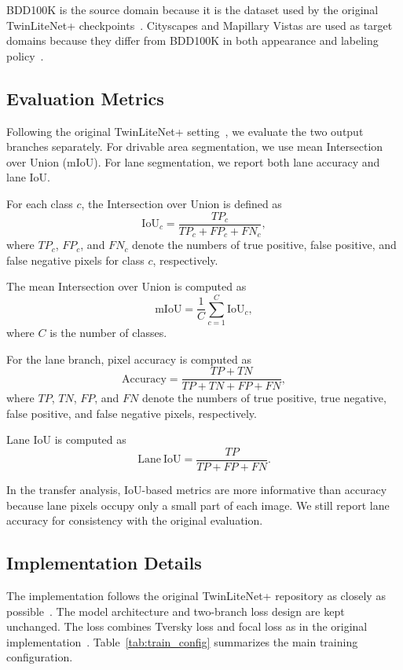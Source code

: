 \documentclass[conference]{IEEEtran}
\begin{document}
BDD100K is the source domain because it is the dataset used by the original TwinLiteNet+ checkpoints~\cite{ref1,ref2}. Cityscapes and Mapillary Vistas are used as target domains because they differ from BDD100K in both appearance and labeling policy~\cite{ref3,ref4}.




\subsection{Evaluation Metrics}
Following the original TwinLiteNet+ setting~\cite{ref1}, we evaluate the two output branches separately. For drivable area segmentation, we use mean Intersection over Union (mIoU). For lane segmentation, we report both lane accuracy and lane IoU.

For each class $c$, the Intersection over Union is defined as
\begin{equation}
  \mathrm{IoU}_c = \frac{TP_c}{TP_c + FP_c + FN_c},
\end{equation}
where $TP_c$, $FP_c$, and $FN_c$ denote the numbers of true positive, false positive, and false negative pixels for class $c$, respectively.

The mean Intersection over Union is computed as
\begin{equation}
  \mathrm{mIoU} = \frac{1}{C}\sum_{c=1}^{C}\mathrm{IoU}_c,
\end{equation}
where $C$ is the number of classes.

For the lane branch, pixel accuracy is computed as
\begin{equation}
  \mathrm{Accuracy} = \frac{TP + TN}{TP + TN + FP + FN},
\end{equation}
where $TP$, $TN$, $FP$, and $FN$ denote the numbers of true positive, true negative, false positive, and false negative pixels, respectively.

Lane IoU is computed as
\begin{equation}
  \mathrm{Lane\ IoU} = \frac{TP}{TP + FP + FN}.
\end{equation}

In the transfer analysis, IoU-based metrics are more informative than accuracy because lane pixels occupy only a small part of each image. We still report lane accuracy for consistency with the original evaluation.

\subsection{Implementation Details}
The implementation follows the original TwinLiteNet+ repository as closely as possible~\cite{ref1}. The model architecture and two-branch loss design are kept unchanged. The loss combines Tversky loss and focal loss as in the original implementation~\cite{ref1,ref12,ref13}. Table~\ref{tab:train_config} summarizes the main training configuration.
\end{document}
